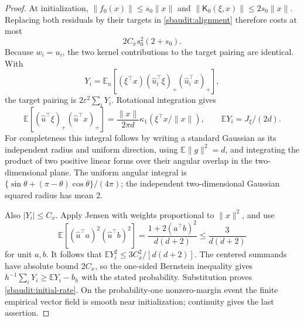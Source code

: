 \documentclass[10pt]{article}
\theoremstyle{remark}\newtheorem{remark}[theorem]{Remark}
\begin{document}
\begin{proof}
At initialization, $\|f_0(x)\|\le s_0\|x\|$ and
$\|\mathsf K_0(\xi,x)\|\le2s_0\|x\|$. Replacing both residuals by
their targets in \eqref{sbaudit:alignment} therefore costs at most
\[
 2C_xs_0^2(2+s_0).
\]
Because $w_i=u_i$, the two kernel contributions to the target pairing
are identical. With
\[
 Y_i=\mathbb E_n[(\xi^\top x)(\widehat u_i^\top\xi)_+
                                      (\widehat u_i^\top x)_+],
\]
the target pairing is $2\varepsilon^2\sum_iY_i$.
Rotational integration gives
\[
 \mathbb E[(\widehat u^\top\xi)_+(\widehat u^\top x)_+]
 =\frac{\|x\|}{2\pi d}\kappa_1(\xi^\top x/\|x\|),
 \qquad \mathbb EY_i=J_\xi/(2d).
\]
For completeness this integral follows by writing a standard Gaussian
as its independent radius and uniform direction, using
$\mathbb E\|g\|^2=d$, and integrating the product of two positive
linear forms over their angular overlap in the two-dimensional plane.
The uniform angular integral is
$\{\sin\theta+(\pi-\theta)\cos\theta\}/(4\pi)$; the independent
two-dimensional Gaussian squared radius has mean $2$.

Also $|Y_i|\le C_x$. Apply Jensen with weights proportional to
$\|x\|^2$, and use
\[
 \mathbb E[(\widehat u^\top a)^2(\widehat u^\top b)^2]
 =\frac{1+2(a^\top b)^2}{d(d+2)}\le\frac3{d(d+2)}
\]
for unit $a,b$. It follows that
$\mathbb EY_i^2\le3C_x^2/[d(d+2)]$.
The centered summands have absolute bound $2C_x$, so the one-sided
Bernstein inequality gives $h^{-1}\sum_iY_i\ge\mathbb EY_i-b_h$
with the stated probability. Substitution proves
\eqref{sbaudit:initial-rate}. On the probability-one nonzero-margin
event the finite empirical vector field is smooth near initialization;
continuity gives the last assertion.
\end{proof}
\end{document}
